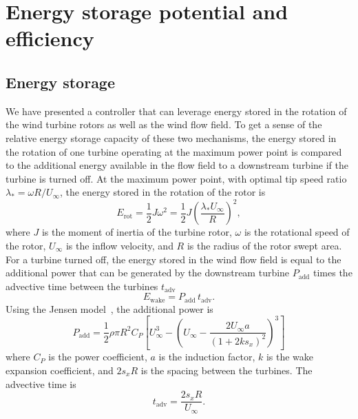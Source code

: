 \appendix
\chapter{Energy storage potential and efficiency}
\label{app}

\section*{Energy storage}

We have presented a controller that can leverage energy stored in the rotation of the wind turbine rotors as well as the wind flow field. To get a sense of the relative energy storage capacity of these two mechanisms, the energy stored in the rotation of one turbine operating at the maximum power point is compared to the additional energy available in the flow field to a downstream turbine if the turbine is turned off. At the maximum power point, with optimal tip speed ratio $\lambda_* = \omega R / U_\infty$, the energy stored in the rotation of the rotor is
\begin{equation}
E_\text{rot} = \frac{1}{2} J \omega^2 =  \frac{1}{2} J \left( \frac{\lambda_* U_\infty}{R} \right)^2 ,
\end{equation}
where $J$ is the moment of inertia of the turbine rotor, $\omega$ is the rotational speed of the rotor, $U_\infty$ is the inflow velocity, and $R$ is the radius of the rotor swept area. For a turbine turned off, the energy stored in the wind flow field is equal to the additional power that can be generated by the downstream turbine $P_\text{add}$ times the advective time between the turbines $t_\text{adv}$
\begin{equation}
E_\text{wake} = P_\text{add} \, t_\text{adv}.
\end{equation}
Using the Jensen model~\cite{Jensen1983a}, the additional power is
\begin{equation}
P_\text{add} = \frac{1}{2} \rho \pi R^2 C_P \left[ U_\infty^3 - \left(U_\infty - \frac{2U_\infty a}{(1 + 2ks_x)^2}\right)^3 \right]
\end{equation}
where $C_P$ is the power coefficient, $a$ is the induction factor, $k$ is the wake expansion coefficient, and $2s_xR$ is the spacing between the turbines. The advective time is
\begin{equation}
t_\text{adv} = \frac{2 s_x R}{U_\infty}.
\end{equation}

